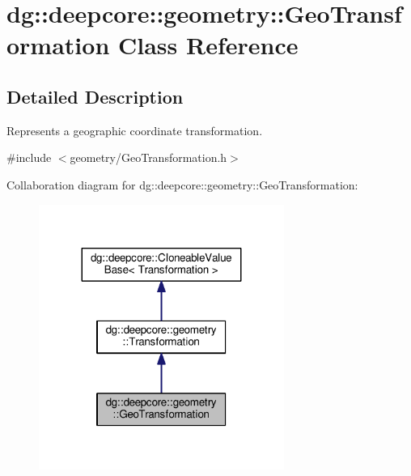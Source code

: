 \hypertarget{classdg_1_1deepcore_1_1geometry_1_1_geo_transformation}{}\section{dg\+:\+:deepcore\+:\+:geometry\+:\+:Geo\+Transformation Class Reference}
\label{classdg_1_1deepcore_1_1geometry_1_1_geo_transformation}


\subsection{Detailed Description}
Represents a geographic coordinate transformation. 

{\ttfamily \#include $<$geometry/\+Geo\+Transformation.\+h$>$}



Collaboration diagram for dg\+:\+:deepcore\+:\+:geometry\+:\+:Geo\+Transformation\+:
\nopagebreak
\begin{figure}[H]
\begin{center}
\leavevmode
\includegraphics[width=227pt]{classdg_1_1deepcore_1_1geometry_1_1_geo_transformation__coll__graph}
\end{center}
\end{figure}
